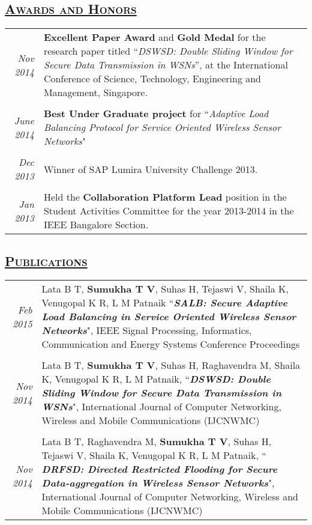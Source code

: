 \documentclass[14pt]{article}
\begin{document}
\subsection* {\scshape\LARGE\uline {Awards and Honors}}
\begin{tabularx}{\textwidth}{r X}
\emph{Nov 2014} & \textbf{Excellent Paper Award} and \textbf{Gold Medal} for the research paper  titled ``\emph{DSWSD: Double Sliding Window for Secure Data Transmission in WSNs}'', at the International Conference of Science, Technology, Engineering and Management, Singapore. \\ \\
\emph{June 2014} & \textbf{Best Under Graduate project} for ``\emph{Adaptive Load Balancing Protocol for Service Oriented Wireless Sensor Networks}" \\ \\
\emph{Dec 2013} & Winner of SAP Lumira University Challenge 2013. \\ \\
\emph{Jan 2013} & Held the \textbf{Collaboration Platform Lead} position in the Student Activities Committee for the year 2013-2014 in the IEEE Bangalore Section. 
\end{tabularx}

\subsection* {\scshape\LARGE\uline {Publications}}
\begin{tabularx}{\textwidth}{r X}
\emph{Feb 2015} & Lata B T, \textbf{Sumukha T V}, Suhas H, Tejaswi V, Shaila K, Venugopal K R, L M Patnaik ``\textbf{\textit{SALB: Secure Adaptive Load 		         Balancing in Service Oriented Wireless Sensor Networks}}",  IEEE Signal Processing, Informatics, Communication and Energy Systems Conference Proceedings \\ \\
\emph{Nov 2014} & Lata B T, \textbf{Sumukha T V}, Suhas H, Raghavendra M, Shaila K, Venugopal K R, L M Patnaik, ``\textbf{\textit{DSWSD: Double Sliding Window for Secure Data Transmission in WSNs}}", International Journal of Computer Networking, Wireless and Mobile Communications (IJCNWMC) \\ \\
\emph{Nov 2014} & Lata B T, Raghavendra M,  \textbf{Sumukha T V}, Suhas H, Tejaswi V, Shaila K, Venugopal K R, L M Patnaik, `` \textbf{\textit{DRFSD: Directed Restricted Flooding for Secure Data-aggregation in Wireless Sensor Networks}}", International Journal of Computer Networking, Wireless and Mobile Communications (IJCNWMC)
\end{tabularx}
\end{document}
